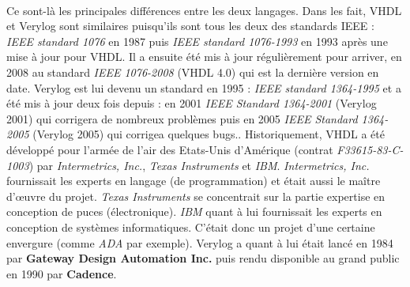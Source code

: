 \\
\par
Ce sont-là les principales différences entre les deux langages. Dans les fait, VHDL et Verylog sont similaires puisqu'ils sont tous les deux des standards IEEE : \textit{IEEE standard 1076} en 1987 puis \textit{IEEE standard 1076-1993} en 1993 après une mise à jour pour VHDL. Il a ensuite été mis à jour régulièrement pour arriver, en 2008 au standard \textit{IEEE 1076-2008} (VHDL 4.0) qui est la dernière version en date. Verylog est lui devenu un standard en 1995 : \textit{IEEE standard 1364-1995} et a été mis à jour deux fois depuis : en 2001  \textit{IEEE Standard 1364-2001} (Verylog 2001) qui corrigera de nombreux problèmes puis en 2005  \textit{IEEE Standard 1364-2005} (Verylog 2005) qui corrigea quelques bugs.. Historiquement, VHDL a été développé pour l'armée de l'air des Etats-Unis d'Amérique (contrat \textit{F33615-83-C-1003}) par \textit{Intermetrics, Inc.}, \textit{Texas Instruments} et \textit{IBM}. \textit{Intermetrics, Inc.}  fournissait les experts en langage (de programmation) et était aussi le maître d'\oe{}uvre du projet. \textit{Texas Instruments} se concentrait sur la partie expertise en conception de puces (électronique). \textit{IBM} quant à lui fournissait les experts en conception de systèmes informatiques. C'était donc un projet d'une certaine envergure (comme \textit{ADA} par exemple). Verylog a quant à lui était lancé en 1984 par \textbf{Gateway Design Automation Inc.}  puis rendu disponible au grand public en 1990 par \textbf{Cadence}.
